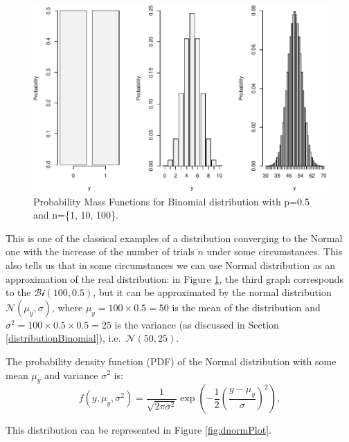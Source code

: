 \documentclass[
]{book}
\theoremstyle{definition}
\theoremstyle{definition}
\theoremstyle{definition}
\theoremstyle{definition}
\theoremstyle{remark}
\begin{document}
\begin{figure}
\centering
\includegraphics{Svetunkov---Statistics-for-Business-Analytics_files/figure-latex/binomialPMFSeveral-1.pdf}
\caption{\label{fig:binomialPMFSeveral}Probability Mass Functions for Binomial distribution with p=0.5 and n=\{1, 10, 100\}.}
\end{figure}

This is one of the classical examples of a distribution converging to the Normal one with the increase of the number of trials \(n\) under some circumstances. This also tells us that in some circumstances we can use Normal distribution as an approximation of the real distribution: in Figure \ref{fig:binomialPMFSeveral}, the third graph corresponds to the \(\mathcal{Bi}(100, 0.5)\), but it can be approximated by the normal distribution \(\mathcal{N}(\mu_y, \sigma)\), where \(\mu_y=100 \times 0.5 = 50\) is the mean of the distribution and \(\sigma^2 = 100 \times 0.5 \times 0.5 = 25\) is the variance (as discussed in Section \ref{distributionBinomial}), i.e.~\(\mathcal{N}(50, 25)\).

The probability density function (PDF) of the Normal distribution with some mean \(\mu_y\) and variance \(\sigma^2\) is:
\begin{equation}
    f(y, \mu_y, \sigma^2) = \frac{1}{\sqrt{2 \pi \sigma^2}} \exp \left( -\frac{1}{2} \left(\frac{y - \mu_y}{\sigma}\right)^2 \right) ,
    \label{eq:Normal}
\end{equation}

This distribution can be represented in Figure \ref{fig:dnormPlot}.
\end{document}
